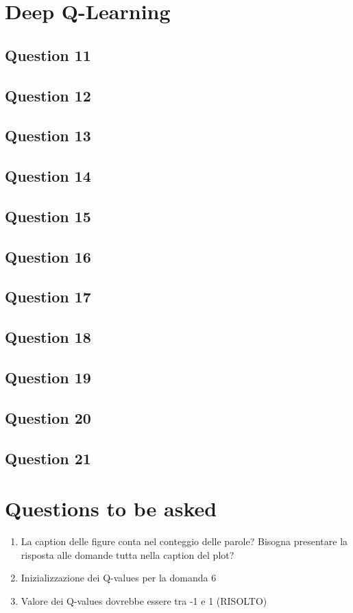 \documentclass[10pt]{IEEEtran}
\begin{document}
\section{Deep Q-Learning}
\subsection*{Question 11}
\subsection*{Question 12}
\subsection*{Question 13}
\subsection*{Question 14}
\subsection*{Question 15}
\subsection*{Question 16}
\subsection*{Question 17}
\subsection*{Question 18}
\subsection*{Question 19}
\subsection*{Question 20}
\subsection*{Question 21}

\section*{Questions to be asked}
\begin{enumerate}
    \item La caption delle figure conta nel conteggio delle parole? Bisogna presentare la risposta alle domande tutta nella caption del plot?
    \item Inizializzazione dei Q-values per la domanda 6 
    \item Valore dei Q-values dovrebbe essere tra -1 e 1 (RISOLTO)
\end{enumerate}


\nocite{*}
\printbibliography

\clearpage
{}
\end{document}
